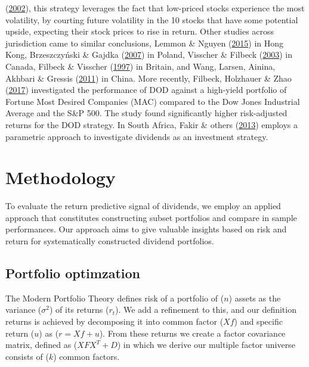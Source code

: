 \documentclass[11pt,preprint, authoryear]{elsarticle}
\numberwithin{equation}{section}
\numberwithin{figure}{section}
\numberwithin{table}{section}
\begin{document}
(\protect\hyperlink{ref-gardner2002motley}{2002}), this strategy
leverages the fact that low-priced stocks experience the most
volatility, by courting future volatility in the 10 stocks that have
some potential upside, expecting their stock prices to rise in return.
Other studies across jurisdiction came to similar conclusions, Lemmon \&
Nguyen (\protect\hyperlink{ref-lemmon2015dividend}{2015}) in Hong Kong,
Brzeszczyński \& Gajdka
(\protect\hyperlink{ref-brzeszczynski2007dividend}{2007}) in Poland,
Visscher \& Filbeck (\protect\hyperlink{ref-visscher2003dividend}{2003})
in Canada, Filbeck \& Visscher
(\protect\hyperlink{ref-filbeck1997}{1997}) in Britain, and Wang,
Larsen, Ainina, Akhbari \& Gressis
(\protect\hyperlink{ref-wang2011dogs}{2011}) in China. More recently,
Filbeck, Holzhauer \& Zhao
(\protect\hyperlink{ref-filbeck2017dividend}{2017}) investigated the
performance of DOD against a high-yield portfolio of Fortune Most
Desired Companies (MAC) compared to the Dow Jones Industrial Average and
the S\&P 500. The study found significantly higher risk-adjusted returns
for the DOD strategy. In South Africa, Fakir \& others
(\protect\hyperlink{ref-fakir2013dividend}{2013}) employs a parametric
approach to investigate dividends as an investment strategy.

\hypertarget{methodology}{%
\section*{Methodology}\label{methodology}}

To evaluate the return predictive signal of dividends, we employ an
applied approach that constitutes constructing subset portfolios and
compare in sample performances. Our approach aims to give valuable
insights based on risk and return for systematically constructed
dividend portfolios.

\hypertarget{portfolio-optimzation}{%
\subsection*{Portfolio optimzation}\label{portfolio-optimzation}}

The Modern Portfolio Theory defines risk of a portfolio of (\(n\))
assets as the variance (\(\sigma^2\)) of its returns (\(r_{t}\)). We add
a refinement to this, and our definition returns is achieved by
decomposing it into common factor (\(Xf\)) and specific return (\(u\))
as (\(r = Xf+ u\)). From these returns we create a factor covariance
matrix, defined as (\(X F X^T+D\)) in which we derive our multiple
factor universe consists of (\(k\)) common factors.
\end{document}
